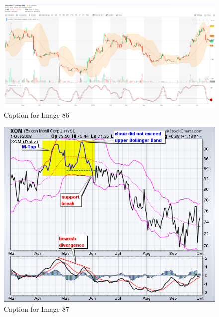 \documentclass{article}
\begin{document}
\vspace{10pt}

\begin{figure}[!htb]
    \centering
    \includegraphics[width=\textwidth]{imgs/86.png}
    \caption{Caption for Image 86}
\end{figure}

\vspace{10pt}

\begin{figure}[!htb]
    \centering
    \includegraphics[width=\textwidth]{imgs/87.png}
    \caption{Caption for Image 87}
\end{figure}

\vspace{10pt}
\end{document}
